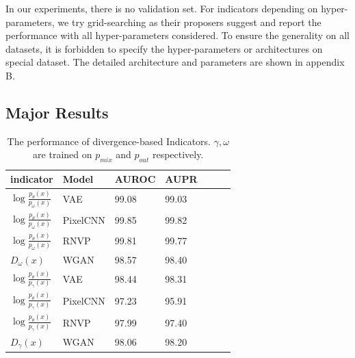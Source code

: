 \documentclass[letterpaper]{article} %
\newcommand{\pout}{p_{out}}
\newcommand{\pmix}{p_{mix}}
\begin{document}
In our experiments, there is no validation set. For indicators depending on hyper-parameters, we try grid-searching as their proposers suggest and report the performance with all hyper-parameters considered. To ensure the generality on all datasets, it is forbidden to specify the hyper-parameters or architectures on special dataset. 
The detailed architecture and parameters are shown in appendix B. 

\subsection{Major Results}


\begin{table}[htbp]
\centering
\begin{tabular}{lllllll}
indicator     & Model & AUROC & AUPR  \\
\toprule
$\log \frac{p_\theta(x)}{p_\omega(x)}$ & VAE & 99.08 & 99.03 \\
$\log \frac{p_\theta(x)}{p_\omega(x)}$ & PixelCNN & 99.85 & 99.82 \\
$\log \frac{p_\theta(x)}{p_\omega(x)}$ & RNVP & 99.81 & 99.77 \\
$D_\omega(x)$ & WGAN & 98.57 & 98.40 \\
$\log \frac{p_\theta(x)}{p_\gamma(x)}$ & VAE & 98.44 & 98.31 \\
$\log \frac{p_\theta(x)}{p_\gamma(x)}$ & PixelCNN & 97.23 & 95.91 \\
$\log \frac{p_\theta(x)}{p_\gamma(x)}$ & RNVP & 97.99 & 97.40 \\
$D_\gamma(x)$  & WGAN & 98.06 & 98.20 \\
\bottomrule
\end{tabular}
\caption{The performance of divergence-based Indicators. $\gamma, \omega$ are trained on $\pmix$ and $\pout$ respectively. }
\label{tab3}
\end{table}
\end{document}
